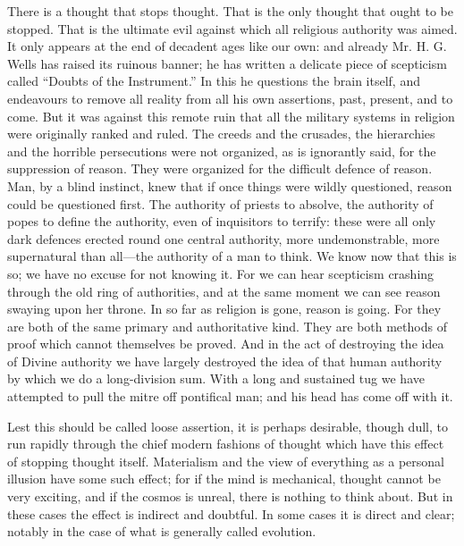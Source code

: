 There is a thought that stops thought. That is the only thought that ought to be stopped. That is the ultimate evil against which all religious authority was aimed. It only appears at the end of decadent ages like our own: and already Mr. H. G. Wells has raised its ruinous banner; he has written a delicate piece of scepticism called “Doubts of the Instrument.” In this he questions the brain itself, and endeavours to remove all reality from all his own assertions, past, present, and to come. But it was against this remote ruin that all the military systems in religion were originally ranked and ruled. The creeds and the crusades, the hierarchies and the horrible persecutions were not organized, as is ignorantly said, for the suppression of reason. They were organized for the difficult defence of reason. Man, by a blind instinct, knew that if once things were wildly questioned, reason could be questioned first. The authority of priests to absolve, the authority of popes to define the authority, even of inquisitors to terrify: these were all only dark defences erected round one central authority, more undemonstrable, more supernatural than all—the authority of a man to think. We know now that this is so; we have no excuse for not knowing it. For we can hear scepticism crashing through the old ring of authorities, and at the same moment we can see reason swaying upon her throne. In so far as religion is gone, reason is going. For they are both of the same primary and authoritative kind. They are both methods of proof which cannot themselves be proved. And in the act of destroying the idea of Divine authority we have largely destroyed the idea of that human authority by which we do a long-division sum. With a long and sustained tug we have attempted to pull the mitre off pontifical man; and his head has come off with it.

Lest this should be called loose assertion, it is perhaps desirable, though dull, to run rapidly through the chief modern fashions of thought which have this effect of stopping thought itself. Materialism and the view of everything as a personal illusion have some such effect; for if the mind is mechanical, thought cannot be very exciting, and if the cosmos is unreal, there is nothing to think about. But in these cases the effect is indirect and doubtful. In some cases it is direct and clear; notably in the case of what is generally called evolution.

